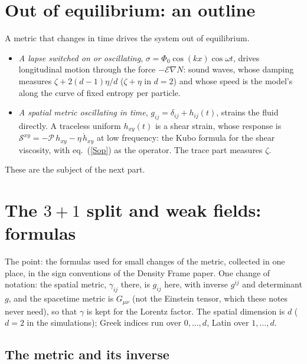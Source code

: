\documentclass[11pt,aps,preprint,nofootinbib,superscriptaddress,tightenlines]{revtex4-2}
\def\edense{{\mathcal{E}}}
\def\Sstress{{\mathcal S}}
\def\pr{{\mathcal P}}
\def\Eq#1{eq.~(\ref{#1})}
\begin{document}
\section{Out of equilibrium: an outline}
\label{sec:outofeq}

A metric that changes in time drives the system out of equilibrium.
\begin{itemize}
\item \emph{A lapse switched on or oscillating}, $\sigma=\Phi_0\cos(kx)\cos\omega t$, drives longitudinal motion through the force $-\edense\nabla N$: sound waves, whose damping
  measures $\zeta+2(d-1)\eta/d$ ($\zeta+\eta$ in $d=2$) and whose speed is the model's along the curve of fixed entropy per particle.
\item \emph{A spatial metric oscillating in time}, $g_{ij}=\delta_{ij}+h_{ij}(t)$, strains the fluid directly.  A traceless uniform $h_{xy}(t)$ is a shear strain, whose response
  is $\Sstress^{xy}=-\pr\,h_{xy}-\eta\,\dot h_{xy}$ at low frequency: the Kubo formula for the shear viscosity, with \Eq{Sop} as the operator.  The trace part measures $\zeta$.
\end{itemize}
These are the subject of the next part.

\appendix

\section{The $3+1$ split and weak fields: formulas}
\label{app:adm}

The point: the formulas used for small changes of the metric, collected in one place, in the sign conventions of the Density Frame paper.  One change of
notation: the spatial metric, $\gamma_{ij}$ there, is $g_{ij}$ here, with inverse $g^{ij}$ and determinant $g$, and the spacetime metric is $G_{\mu\nu}$ (not the
Einstein tensor, which these notes never need), so that $\gamma$ is kept for the Lorentz factor.  The
spatial dimension is $d$ ($d=2$ in the simulations); Greek indices run over $0,\dots,d$, Latin over $1,\dots,d$.

\subsection{The metric and its inverse}
\end{document}
